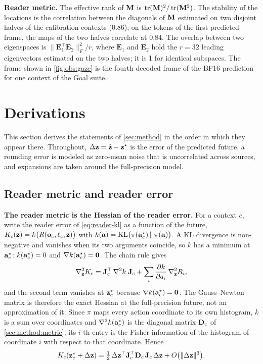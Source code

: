 \noindent\textbf{Reader metric.}
The effective rank of $\mathbf{M}$ is $\operatorname{tr}(\mathbf{M})^2 / \operatorname{tr}(\mathbf{M}^2)$.
The stability of the locations is the correlation between the diagonals of $\mathbf{M}$ estimated on two disjoint halves of the calibration contexts (0.86); on the tokens of the first predicted frame, the maps of the two halves correlate at 0.84.
The overlap between two eigenspaces is $\|\mathbf{E}_1^\top \mathbf{E}_2\|_F^2 / r$, where $\mathbf{E}_1$ and $\mathbf{E}_2$ hold the $r = 32$ leading eigenvectors estimated on the two halves; it is 1 for identical subspaces.
The frame shown in \cref{fig:obs:gaze} is the fourth decoded frame of the BF16 prediction for one context of the Goal suite.


\section{Derivations}
\label{sec:supp:theory}
This section derives the statements of \cref{sec:method} in the order in which they appear there.
Throughout, $\Delta\mathbf{z} = \hat{\mathbf{z}} - \mathbf{z}^\star$ is the error of the predicted future, a rounding error is modeled as zero-mean noise that is uncorrelated across sources, and expansions are taken around the full-precision model.

\subsection{Reader metric and reader error}
\label{sec:supp:theory:metric-kl}
\noindent\textbf{The reader metric is the Hessian of the reader error.}
For a context $c$, write the reader error of \cref{eq:reader-kl} as a function of the future, $K_c(\mathbf{z}) = k\big(R(\mathbf{o}_c, \ell_c, \mathbf{z})\big)$ with $k(\mathbf{a}) = \mathrm{KL}\big(\pi(\mathbf{a}^\star_c)\,\|\,\pi(\mathbf{a})\big)$.
A KL divergence is non-negative and vanishes when its two arguments coincide, so $k$ has a minimum at $\mathbf{a}^\star_c$: $k(\mathbf{a}^\star_c) = 0$ and $\nabla k(\mathbf{a}^\star_c) = \mathbf{0}$.
The chain rule gives
\begin{equation}
  \nabla^2_{\mathbf{z}} K_c = \mathbf{J}_c^\top\, \nabla^2 k\; \mathbf{J}_c + \sum_i \frac{\partial k}{\partial a_i}\, \nabla^2_{\mathbf{z}} R_i ,
  \label{eq:supp:chain}
\end{equation}
and the second term vanishes at $\mathbf{z}^\star_c$ because $\nabla k(\mathbf{a}^\star_c) = \mathbf{0}$.
The Gauss--Newton matrix is therefore the exact Hessian at the full-precision future, not an approximation of it.
Since $\pi$ maps every action coordinate to its own histogram, $k$ is a sum over coordinates and $\nabla^2 k(\mathbf{a}^\star_c)$ is the diagonal matrix $\mathbf{D}_c$ of \cref{sec:method:metric}; its $i$-th entry is the Fisher information of the histogram of coordinate $i$ with respect to that coordinate.
Hence
\begin{equation}
  K_c(\mathbf{z}^\star_c + \Delta\mathbf{z}) = \tfrac12\, \Delta\mathbf{z}^\top \mathbf{J}_c^\top \mathbf{D}_c\, \mathbf{J}_c\, \Delta\mathbf{z} + O\big(\|\Delta\mathbf{z}\|^3\big).
  \label{eq:supp:k2}
\end{equation}

